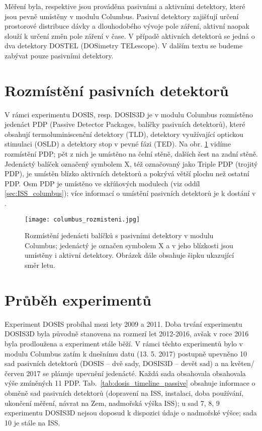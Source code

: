 Měření byla, respektive jsou prováděna pasivními a aktivními detektory, které jsou pevně umístěny v modulu Columbus. Pasivní detektory zajišťují určení prostorové distribuce dávky a dlouhodobého vývoje pole záření, aktivní naopak slouží k určení změn pole záření v čase. V případě aktivních detektorů se jedná o dva detektory DOSTEL (DOSimetry TELescope). V dalším textu se budeme zabývat pouze pasivními detektory.

\section{Rozmístění pasivních detektorů}
V rámci experimentu DOSIS, resp. DOSIS3D je v modulu Columbus rozmístěno jedenáct PDP (Passive Detector Packages, balíčky pasivních detektorů), které obsahují termoluminiscenční detektory (TLD), detektory využívající optickou stimulaci (OSLD) a detektory stop v pevné fázi (TED). Na obr. \ref{fig:columbus_rozmisteni} vidíme rozmístění PDP; pět z nich je umístěno na čelní stěně, dalších šest na zadní stěně. Jedenáctý balíček označený symbolem X, též označovaný jako Triple PDP (trojitý PDP), je umístěn blízko aktivních detektorů a pokrývá větší plochu než ostatní PDP. Osm PDP je umístěno ve skříňových modulech (viz oddíl \ref{sec:ISS_columbus}); více informací o umístění pasivních detektorů je k dostání v \cite{dosis}. %
\begin{figure}[ht]
  \centering
  \texttt{[image: columbus\_rozmisteni.jpg]}
  \caption{Rozmístění jedenácti balíčků s pasivními detektory v modulu Columbus; jedenáctý je označen symbolem X a v jeho blízkosti jsou umístěny i aktivní detektory. Obrázek dále obsahuje šipku ukazující směr letu. \cite{dosis}}
  \label{fig:columbus_rozmisteni}
\end{figure}

\section{Průběh experimentů}%
Experiment DOSIS probíhal mezi lety 2009 a 2011. Doba trvání experimentu DOSIS3D byla původně stanovena na rozmezí let 2012-2016, avšak v roce 2016 byla prodloužena a experiment stále běží. V rámci těchto experimentů bylo v modulu Columbus zatím k dnešnímu datu (13. 5. 2017) postupně upevněno 10 sad pasivních detektorů (DOSIS -- dvě sady, DOSIS3D -- devět sad) a na květen/červen 2017 se plánuje upevnění jedenácté. Každá sada obsahovala obsahovala výše zmíněných 11 PDP. Tab.~\ref{tab:dosis_timeline_passive} obsahuje informace o obměně sad pasivních detektorů (dopravení na ISS, instalaci, doba používání, ukončení měření,
návrat na Zem, nadmořská výška ISS); u sad 7, 8, 9 experimentu DOSIS3D nejsou doposud k dispozici údaje o nadmořské výšce; sada 10 je stále na ISS. 

